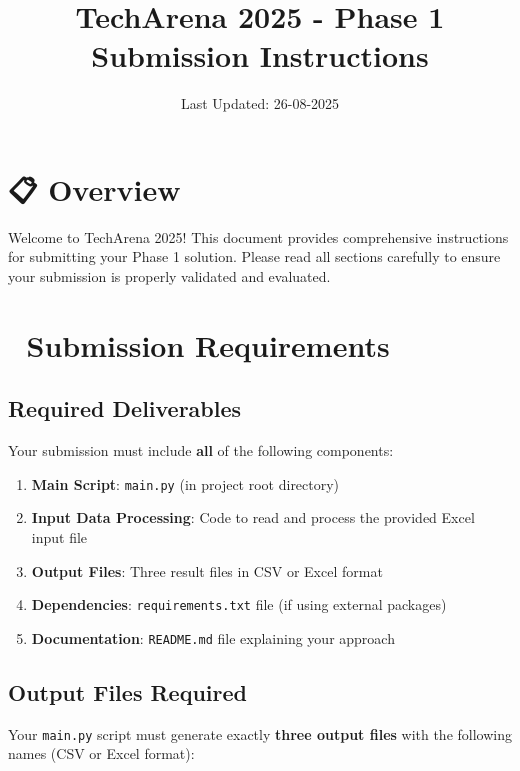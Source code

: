 \documentclass[11pt,a4paper]{article}
\title{\textbf{TechArena 2025 - Phase 1 Submission Instructions}}
\author{}
\date{Last Updated: 26-08-2025}
\begin{document}
\maketitle
\thispagestyle{fancy}

\section*{📋 Overview}

Welcome to TechArena 2025! This document provides comprehensive instructions for submitting your Phase 1 solution. Please read all sections carefully to ensure your submission is properly validated and evaluated.

\section*{🎯 Submission Requirements}

\subsection*{Required Deliverables}

Your submission must include \textbf{all} of the following components:

\begin{enumerate}
    \item \textbf{Main Script}: \texttt{main.py} (in project root directory)
    \item \textbf{Input Data Processing}: Code to read and process the provided Excel input file
    \item \textbf{Output Files}: Three result files in CSV or Excel format
    \item \textbf{Dependencies}: \texttt{requirements.txt} file (if using external packages)
    \item \textbf{Documentation}: \texttt{README.md} file explaining your approach
\end{enumerate}

\subsection*{Output Files Required}

Your \texttt{main.py} script must generate exactly \textbf{three output files} with the following names (CSV or Excel format):
\end{document}
